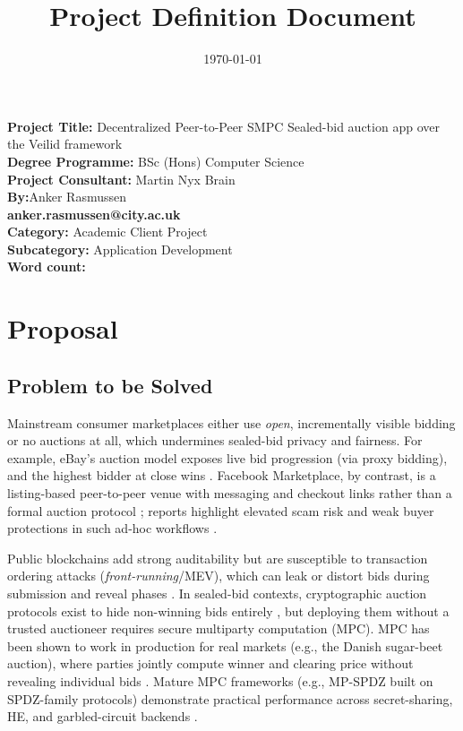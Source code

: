 \documentclass[12pt,a4paper]{article}
\title{Project Definition Document}
\author{}
\date{\today}
\begin{document}
\maketitle

\begin{center}
\textbf {Project Title:} {Decentralized Peer-to-Peer SMPC Sealed-bid auction app over the Veilid framework} \\[1cm]
\textbf{Degree Programme:} {BSc (Hons) Computer Science} \\[1cm]
\textbf{Project Consultant:} {Martin Nyx Brain} \\[1cm]
\textbf{By:}{Anker Rasmussen} \\[0.2cm]
{\small \textbf{anker.rasmussen@city.ac.uk}} \\ [0.3cm]
\textbf{Category:} Academic Client Project \\[0.3cm]
{\small \textbf{Subcategory:} Application Development} \\[1cm]
\textbf {Word count:}
\end{center}

\newpage


\section{Proposal}

\subsection{Problem to be Solved}
Mainstream consumer marketplaces either use \emph{open}, incrementally visible bidding or no auctions at all, which undermines sealed-bid privacy and fairness. For example, eBay’s auction model exposes live bid progression (via proxy bidding), and the highest bidder at close wins \parencite{ebay_help_bidding}. Facebook Marketplace, by contrast, is a listing-based peer-to-peer venue with messaging and checkout links rather than a formal auction protocol \parencite{fb_marketplace_help}; reports highlight elevated scam risk and weak buyer protections in such ad-hoc workflows \parencite{wsj_fb_marketplace_scams}.

Public blockchains add strong auditability but are susceptible to transaction ordering attacks (\emph{front-running}/MEV), which can leak or distort bids during submission and reveal phases \parencite{daian2020_flashboys2}. In sealed-bid contexts, cryptographic auction protocols exist to hide non-winning bids entirely \parencite{sako2000_hide_losers}, but deploying them without a trusted auctioneer requires secure multiparty computation (MPC). MPC has been shown to work in production for real markets (e.g., the Danish sugar-beet auction), where parties jointly compute winner and clearing price without revealing individual bids \parencite{bogetoft2009_mpc_live}. Mature MPC frameworks (e.g., MP-SPDZ built on SPDZ-family protocols) demonstrate practical performance across secret-sharing, HE, and garbled-circuit backends \parencite{mp-spdz,damgaard2012_spdz,evans2018_pragmatic_mpc}.
\end{document}
